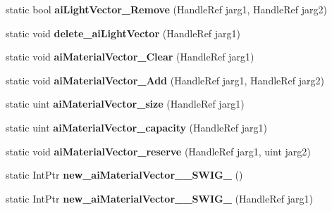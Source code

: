 \begin{DoxyCompactItemize}
\item 
\hypertarget{class_assimp_p_i_n_v_o_k_e_a0daddd7edf7a6fb531624bd2dd97617e}{static bool {\bfseries ai\+Light\+Vector\+\_\+\+Remove} (Handle\+Ref jarg1, Handle\+Ref jarg2)}\label{class_assimp_p_i_n_v_o_k_e_a0daddd7edf7a6fb531624bd2dd97617e}

\item 
\hypertarget{class_assimp_p_i_n_v_o_k_e_a173aaa7267b3fa733f981892b28f881c}{static void {\bfseries delete\+\_\+ai\+Light\+Vector} (Handle\+Ref jarg1)}\label{class_assimp_p_i_n_v_o_k_e_a173aaa7267b3fa733f981892b28f881c}

\item 
\hypertarget{class_assimp_p_i_n_v_o_k_e_a0b0b481013c4d4879dd1c44678a799fa}{static void {\bfseries ai\+Material\+Vector\+\_\+\+Clear} (Handle\+Ref jarg1)}\label{class_assimp_p_i_n_v_o_k_e_a0b0b481013c4d4879dd1c44678a799fa}

\item 
\hypertarget{class_assimp_p_i_n_v_o_k_e_a3d7ff32c6d35ff24ad43251f187fba08}{static void {\bfseries ai\+Material\+Vector\+\_\+\+Add} (Handle\+Ref jarg1, Handle\+Ref jarg2)}\label{class_assimp_p_i_n_v_o_k_e_a3d7ff32c6d35ff24ad43251f187fba08}

\item 
\hypertarget{class_assimp_p_i_n_v_o_k_e_a76ae9ebeef7346cf30a7694d6ead9ebc}{static uint {\bfseries ai\+Material\+Vector\+\_\+size} (Handle\+Ref jarg1)}\label{class_assimp_p_i_n_v_o_k_e_a76ae9ebeef7346cf30a7694d6ead9ebc}

\item 
\hypertarget{class_assimp_p_i_n_v_o_k_e_a16ffa5b9849ec17cf2fded339ac3123e}{static uint {\bfseries ai\+Material\+Vector\+\_\+capacity} (Handle\+Ref jarg1)}\label{class_assimp_p_i_n_v_o_k_e_a16ffa5b9849ec17cf2fded339ac3123e}

\item 
\hypertarget{class_assimp_p_i_n_v_o_k_e_a1711433580060ae2155b71461c23a06f}{static void {\bfseries ai\+Material\+Vector\+\_\+reserve} (Handle\+Ref jarg1, uint jarg2)}\label{class_assimp_p_i_n_v_o_k_e_a1711433580060ae2155b71461c23a06f}

\item 
\hypertarget{class_assimp_p_i_n_v_o_k_e_a865aea21d3df01157e7f02e78f7c91ff}{static Int\+Ptr {\bfseries new\+\_\+ai\+Material\+Vector\+\_\+\+\_\+\+S\+W\+I\+G\+\_} ()}\label{class_assimp_p_i_n_v_o_k_e_a865aea21d3df01157e7f02e78f7c91ff}

\item 
\hypertarget{class_assimp_p_i_n_v_o_k_e_aa78d5f8d73e1407331a07cd0b47b84a1}{static Int\+Ptr {\bfseries new\+\_\+ai\+Material\+Vector\+\_\+\+\_\+\+S\+W\+I\+G\+\_} (Handle\+Ref jarg1)}\label{class_assimp_p_i_n_v_o_k_e_aa78d5f8d73e1407331a07cd0b47b84a1}


\end{DoxyCompactItemize}
